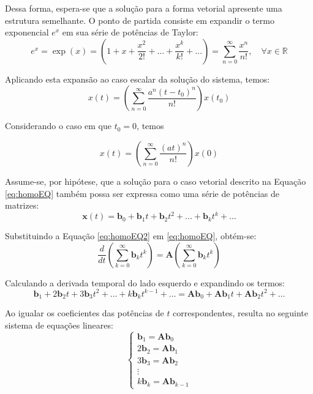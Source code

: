\documentclass[a4paper,12pt]{article}
\begin{document}
Dessa forma, espera-se que a solução para a forma vetorial apresente uma estrutura semelhante. O ponto de partida consiste em expandir o termo exponencial $e^x$ em sua série de potências de Taylor:
\begin{equation}
    e^x = \exp(x) = \left( 1 + x + \frac{x^2}{2!} + \dots + \frac{x^k}{k!} + \dots \right) = \sum_{n=0}^{\infty} \frac{x^n}{n!}, \quad \forall x \in \mathbb{R}
    \label{eq:taylor1}
\end{equation}

Aplicando esta expansão ao caso escalar da solução do sistema, temos:
\begin{equation}
    x(t) = \left( \sum_{n=0}^{\infty} \frac{a^n(t-t_0)^n}{n!} \right) x(t_0)
\end{equation}

Considerando o caso em que $t_0=0$, temos

\begin{equation}
    x(t) = \left( \sum_{n=0}^{\infty} \frac{(at)^n }{n!} \right) x(0)
    \label{eq:taylor}
\end{equation}

Assume-se, por hipótese, que a solução para o caso vetorial descrito na Equação \eqref{eq:homoEQ} também possa ser expressa como uma série de potências de matrizes:
\begin{equation}
    \mathbf{x}(t) = \mathbf{b}_0 + \mathbf{b}_1 t + \mathbf{b}_2 t^2 + \dots + \mathbf{b}_k t^k + \dots
    \label{eq:homoEQ2}
\end{equation}

Substituindo a Equação \eqref{eq:homoEQ2} em \eqref{eq:homoEQ}, obtém-se:
\begin{equation}
    \frac{d}{dt} \left( \sum_{k=0}^{\infty} \mathbf{b}_k t^k \right) = \mathbf{A} \left( \sum_{k=0}^{\infty} \mathbf{b}_k t^k \right)
\end{equation}

Calculando a derivada temporal do lado esquerdo e expandindo os termos:
\begin{equation}
    \mathbf{b}_1 + 2\mathbf{b}_2 t + 3\mathbf{b}_3 t^2 + \dots + k\mathbf{b}_k t^{k-1} + \dots = \mathbf{A}\mathbf{b}_0 + \mathbf{A}\mathbf{b}_1 t + \mathbf{A}\mathbf{b}_2 t^2 + \dots
\end{equation}

Ao igualar os coeficientes das potências de $t$ correspondentes, resulta no seguinte sistema de equações lineares:
\begin{equation}
    \begin{cases}
        \mathbf{b}_1 = \mathbf{A}\mathbf{b}_0 \\
        2\mathbf{b}_2 = \mathbf{A}\mathbf{b}_1 \\
        3\mathbf{b}_3 = \mathbf{A}\mathbf{b}_2 \\
        \vdots \\
        k\mathbf{b}_k = \mathbf{A}\mathbf{b}_{k-1}
    \end{cases}
\end{equation}
\end{document}
